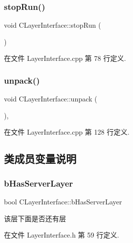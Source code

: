 \subsubsection{\texorpdfstring{stop\+Run()}{stopRun()}}
{\footnotesize\ttfamily void C\+Layer\+Interface\+::stop\+Run (\begin{DoxyParamCaption}{ }\end{DoxyParamCaption})}



在文件 Layer\+Interface.\+cpp 第 78 行定义.

\mbox{\label{class_c_layer_interface_a94cb2e090328df13a252a2ea40db94d8}} 
\subsubsection{\texorpdfstring{unpack()}{unpack()}}
{\footnotesize\ttfamily void C\+Layer\+Interface\+::unpack (\begin{DoxyParamCaption}{ }\end{DoxyParamCaption})\hspace{0.3cm}{\ttfamily [protected]}, {\ttfamily [virtual]}}



在文件 Layer\+Interface.\+cpp 第 128 行定义.



\subsection{类成员变量说明}
\mbox{\label{class_c_layer_interface_ab5e0e1580b714b045664a8051373b8f2}} 
\subsubsection{\texorpdfstring{b\+Has\+Server\+Layer}{bHasServerLayer}}
{\footnotesize\ttfamily bool C\+Layer\+Interface\+::b\+Has\+Server\+Layer\hspace{0.3cm}{\ttfamily [protected]}}

该层下面是否还有层 

在文件 Layer\+Interface.\+h 第 59 行定义.


